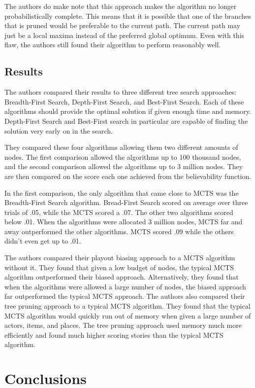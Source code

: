\documentclass{sig-alternate}
\begin{document}
The authors do make note that this approach makes the algorithm no longer probabilistically complete. This means that it is possible that one of the branches that is pruned would be preferable to the current path. The current path may just be a local maxima instead of the preferred global optimum. Even with this flaw, the authors still found their algorithm to perform reasonably well. 

\subsection{Results}
The authors compared their results to three different tree search approaches: Breadth-First Search, Depth-First Search, and Best-First Search\cite{Narrative}. Each of these algorithms should provide the optimal solution if given enough time and memory. Depth-First Search and Best-First search in particular are capable of finding the solution very early on in the search.

They compared these four algorithms allowing them two different amounts of nodes. The first comparison allowed the algorithms up to 100 thousand nodes, and the second comparison allowed the algorithms up to 3 million nodes. They are then compared on the score each one achieved from the believability function.

In the first comparison, the only algorithm that came close to MCTS was the Breadth-First Search algorithm. Bread-First Search scored on average over three trials of .05, while the MCTS scored a .07. The other two algorithms scored below .01. When the algorithms were allocated 3 million nodes, MCTS far and away outperformed the other algorithms. MCTS scored .09 while the others didn't even get up to .01.

The authors compared their playout biasing approach to a MCTS algorithm without it. They found that given a low budget of nodes, the typical MCTS algorithm outperformed their biased approach. Alternatively, they found that when the algorithms were allowed a large number of nodes, the biased approach far outperformed the typical MCTS approach. The authors also compared their tree pruning approach to a typical MCTS algorithm. They found that the typical MCTS algorithm would quickly run out of memory when given a large number of actors, items, and places. The tree pruning approach used memory much more efficiently and found much higher scoring stories than the typical MCTS algorithm.

\section{Conclusions}
\end{document}
